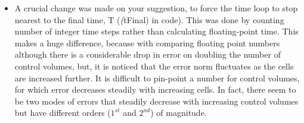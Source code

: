 \documentclass[a4paper,10pt]{article}
\begin{document}
\begin{itemize}
\item A crucial change was made on your suggestion, to force the time loop to stop nearest to the final time, T (\emph(tFinal) in code). This was done by counting number of integer time steps rather than calculating floating-point time. This makes a huge difference, because with comparing floating point numbers although there is a considerable drop in error on doubling the number of control volumes, but, it is noticed that the error norm fluctuates as the cells are increased further. It is difficult to pin-point a number for control volumes, for which error decreases steadily with increasing cells. In fact, there seem to be two modes of errors that steadily decrease with increasing control volumes but have different orders ($1^{st}$ and $2^{nd}$) of magnitude. 

\end{itemize}
\end{document}
